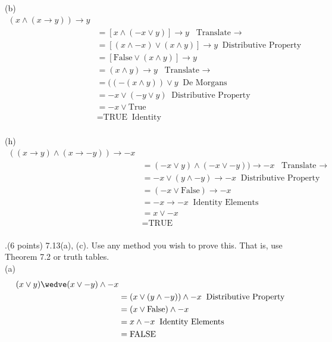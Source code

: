 \documentclass[12pt]{article}
\begin{document}
\vspace{0.25in}
(b)
\[
\begin{aligned} 
(x \wedge (x \rightarrow y)) \rightarrow y \\
&= [x \wedge (-x \vee y)] \rightarrow y \;\;  \mbox{Translate $\rightarrow$} \\
&= [(x \wedge -x) \vee (x \wedge y)] \rightarrow y \;\; \mbox{Distributive Property}\\ 
&= [\mbox{False} \vee (x \wedge y)] \rightarrow y \;\; \\
&= (x \wedge y) \rightarrow y \;\; \mbox{Translate $\rightarrow$} \\
&= ((-(x \wedge y )) \vee y \;\; \mbox{De Morgans}\\
&= -x \vee (-y \vee y) \;\; \mbox{Distributive Property} \\
&= -x \vee \mbox{True} \\
&= \mbox{TRUE} \;\; \mbox{Identity} \\
\end{aligned}
\]
 \vspace{0.25in}

(h) 
\[
\begin{aligned} 
((x \rightarrow y) \wedge (x \rightarrow -y)) \rightarrow -x \\
&= (-x \vee y) \wedge (-x \vee -y)) \rightarrow -x \;\;  \mbox{Translate $\rightarrow$} \\
&= -x \vee (y \wedge -y) \rightarrow -x  \;\; \mbox{Distributive Property}\\ 
&= (-x \vee \mbox{False} ) \rightarrow -x \\
&= -x \rightarrow -x \;\; \mbox{Identity Elements} \\
&= x \vee -x \\
&= \mbox{TRUE} \\
\end{aligned}
\]

.(6 points) 7.13(a), (c).   Use any method you wish to prove this.  That is, use Theorem 7.2 or truth tables.   
\vspace{.05in} \\
(a) 
\[
\begin{aligned} 
(x \vee y) \wedve (x \vee -y) \wedge -x \\
&= (x \vee (y \wedge -y)) \wedge -x \;\;  \mbox{Distributive Property} \\
&= (x \vee \mbox{False} ) \wedge -x   \\ 
&= x \wedge -x \;\; \mbox{Identity Elements} \\
&= \mbox{FALSE} \\
\end{aligned}
\]
\end{document}
